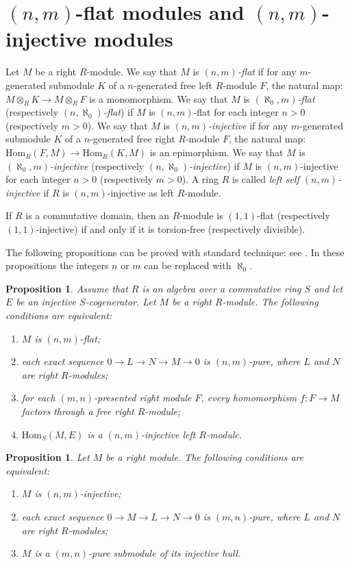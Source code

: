 \documentclass{amsart}
\newtheorem{proposition}[theorem]{Proposition}
\begin{document}
\section{$(n,m)$-flat modules and $(n,m)$-injective modules}
\label{S:flat}
Let $M$ be a right $R$-module. We say that $M$ is $(n,m)${\it -flat} if for any $m$-generated submodule $K$ of a $n$-generated free left $R$-module $F$, the natural map: $M\otimes_RK\rightarrow M\otimes_RF$ is a monomorphism. We say that $M$ is $(\aleph_0,m)${\it -flat} (respectively $(n,\aleph_0)${\it -flat}) if $M$ is $(n,m)$-flat for each integer $n>0$ (respectively $m>0$). We say that $M$ is $(n,m)${\it -injective} if for any $m$-generated submodule $K$ of a $n$-generated free right $R$-module $F$, the natural map: $\mathrm{Hom}_R(F,M)\rightarrow \mathrm{Hom}_R(K,M)$ is an epimorphism. We say that $M$ is $(\aleph_0,m)${\it -injective} (respectively $(n,\aleph_0)${\it -injective}) if $M$ is $(n,m)$-injective for each integer $n>0$ (respectively $m>0$). A ring $R$ is called {\it left self $(n,m)$-injective} if $R$ is $(n,m)$-injective as left $R$-module.

If $R$ is a commutative domain, then an $R$-module is $(1,1)$-flat (respectively $(1,1)$-injective) if and only if it is torsion-free (respectively divisible).

The following propositions can be proved with standard technique: see \cite[Theorem 4.3 and Proposition 2.3]{ZhChZh05}. In these propositions the integers $n$ or $m$ can be replaced with $\aleph_0$.
\begin{proposition}
\label{P:flat} Assume that $R$ is an algebra over a commutative ring $S$ and let $E$ be an injective $S$-cogenerator. Let $M$ be a right $R$-module. The following conditions are equivalent:
\begin{enumerate}
\item $M$ is $(n,m)$-flat;
\item each exact sequence $0\rightarrow L\rightarrow N \rightarrow M\rightarrow 0$ is $(n,m)$-pure, where $L$ and $N$ are right $R$-modules;
\item for each $(m,n)$-presented right module $F$, every homomorphism $f:F\rightarrow M$ factors through a free right $R$-module;
\item $\mathrm{Hom}_S(M,E)$ is a $(n,m)$-injective left $R$-module.
\end{enumerate}
\end{proposition}

\begin{proposition}
\label{P:inj} Let $M$ be a right module. The following conditions are equivalent:
\begin{enumerate}
\item $M$ is $(n,m)$-injective;
\item each exact sequence $0\rightarrow M\rightarrow L\rightarrow N\rightarrow 0$ is $(m,n)$-pure, where $L$ and $N$ are right $R$-modules;
\item $M$ is a $(m,n)$-pure  submodule of its injective hull.
\end{enumerate}
\end{proposition}
\end{document}

